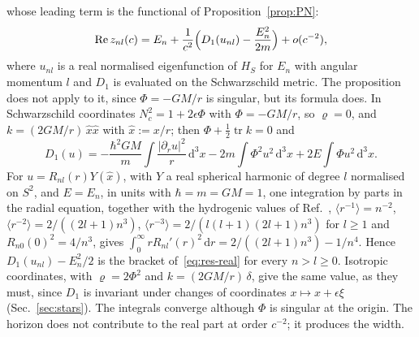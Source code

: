 \documentclass[%
 aip,
 jmp,
 amsmath,amssymb,
 reprint, onecolumn
]{revtex4-1}
\theoremstyle{definition}
\theoremstyle{remark}
\newcommand{\rmd}{\mathrm{d}}
\begin{document}
whose leading term is the functional of Proposition~\ref{prop:PN}:
\begin{equation}\label{eq:res-real-D1}
\mathrm{Re}\,z_{nl}(c)=E_n+\frac{1}{c^2}\Bigl(D_1(u_{nl})-\frac{E_n^2}
{2m}\Bigr)+o(c^{-2}),
\end{equation}
where $u_{nl}$ is a real normalised eigenfunction of $H_S$ for $E_n$ with
angular momentum $l$ and $D_1$ is evaluated on the Schwarzschild metric.
The proposition does not apply to it, since $\Phi=-GM/r$ is singular,
but its formula does. In Schwarzschild coordinates $N_c^2=1+2\epsilon\Phi$
with $\Phi=-GM/r$, so $\varrho=0$, and $k=(2GM/r)\,\hat x\hat x$ with
$\hat x:=x/r$; then $\Phi+\frac12\operatorname{tr}k=0$ and
\begin{equation}\label{eq:D1-schw}
D_1(u)=-\frac{\hbar^2GM}{m}\int\frac{|\partial_ru|^2}{r}\,\rmd^3x
-2m\int\Phi^2u^2\,\rmd^3x+2E\int\Phi u^2\,\rmd^3x .
\end{equation}
For $u=R_{nl}(r)Y(\hat x)$, with $Y$ a real spherical harmonic of
degree $l$ normalised on $S^2$, and $E=E_n$, in units with $\hbar=m=GM=1$, one
integration by parts in the radial equation, together with the
hydrogenic values of Ref.~,
$\langle r^{-1}\rangle=n^{-2}$, $\langle r^{-2}\rangle=2/((2l+1)n^3)$,
$\langle r^{-3}\rangle=2/(l(l+1)(2l+1)n^3)$ for $l\geq1$ and
$R_{n0}(0)^2=4/n^3$, gives
$\int_0^\infty rR_{nl}'(r)^2\,\rmd r=2/((2l+1)n^3)-1/n^4$. Hence
$D_1(u_{nl})-E_n^2/2$ is the bracket of~\eqref{eq:res-real} for every
$n>l\geq0$. Isotropic coordinates, with $\varrho=2\Phi^2$ and
$k=(2GM/r)\,\delta$, give the same value, as they must, since $D_1$ is
invariant under changes of coordinates $x\mapsto x+\epsilon\xi$
(Sec.~\ref{sec:stars}). The integrals converge although $\Phi$ is
singular at the origin. The horizon does not contribute to the real part
at order $c^{-2}$; it produces the width.
\end{document}
